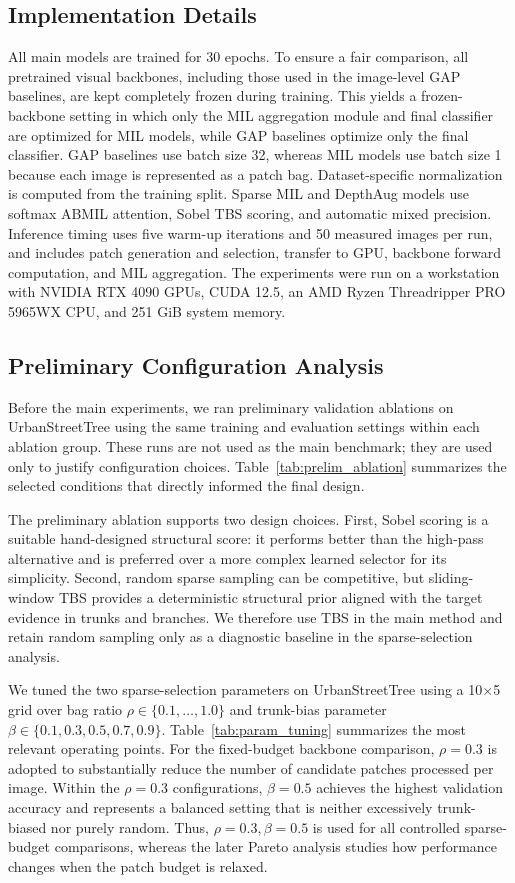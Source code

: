 \documentclass{ieeeaccess}
\begin{document}
\subsection{Implementation Details}
All main models are trained for 30 epochs. To ensure a fair comparison, all pretrained visual
backbones, including those used in the image-level GAP baselines, are kept completely frozen during
training. This yields a frozen-backbone setting in which only the MIL aggregation module and final
classifier are optimized for MIL models, while GAP baselines optimize only the final classifier. GAP
baselines use batch size 32, whereas MIL models use batch size 1 because each image is represented
as a patch bag. Dataset-specific normalization is computed from the training split. Sparse MIL and
DepthAug models use softmax ABMIL attention, Sobel TBS scoring, and automatic mixed precision.
Inference timing uses five warm-up iterations and 50 measured images per run, and includes patch
generation and selection, transfer to GPU, backbone forward computation, and MIL aggregation. The
experiments were run on a workstation with NVIDIA RTX 4090 GPUs, CUDA 12.5, an AMD Ryzen Threadripper PRO 5965WX CPU,
and 251 GiB system memory.

\subsection{Preliminary Configuration Analysis}
\label{sec:prelim_config}
Before the main experiments, we ran preliminary validation ablations on UrbanStreetTree using the
same training and evaluation settings within each ablation group. These runs are not used as the
main benchmark; they are used only to justify configuration choices.
Table~\ref{tab:prelim_ablation} summarizes the selected conditions that directly informed the final
design.

The preliminary ablation supports two design choices. First, Sobel scoring is a suitable
hand-designed structural score: it performs better than the high-pass
alternative and is preferred over a more complex learned selector for its simplicity. Second, random
sparse sampling can be competitive, but sliding-window TBS provides a deterministic structural prior
aligned with the target evidence in trunks and branches. We therefore use TBS in the main method and
retain random sampling only as a diagnostic baseline in the sparse-selection analysis.

We tuned the two sparse-selection parameters on UrbanStreetTree using a 10$\times$5 grid over bag
ratio $\rho\in\{0.1,\ldots,1.0\}$ and trunk-bias parameter $\beta\in\{0.1,0.3,0.5,0.7,0.9\}$.
Table~\ref{tab:param_tuning} summarizes the most relevant operating points. For the fixed-budget
backbone comparison, $\rho=0.3$ is adopted to substantially reduce the number of candidate patches
processed per image. Within the $\rho=0.3$ configurations, $\beta=0.5$ achieves the highest
validation accuracy and represents a balanced setting that is neither excessively trunk-biased nor
purely random. Thus, $\rho=0.3,\beta=0.5$ is used for all controlled sparse-budget comparisons,
whereas the later Pareto analysis studies how performance changes when the patch budget is relaxed.
\end{document}
